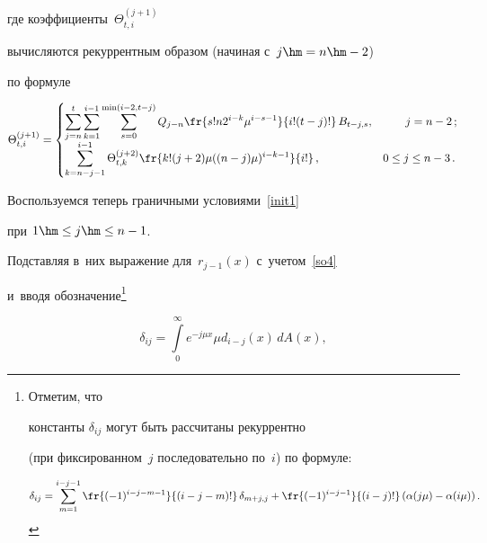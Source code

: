 где коэффициенты~$\Theta^{(j+1)}_{t,i}$

вычисляются рекуррентным образом (начиная с~$j\hm=n\hm-2$)

по формуле



\noindent

$$

\Theta^{(j+1)}_{t,i} =

\begin{cases}

\displaystyle\sum\limits_{j=n}^{t}

\sum\limits_{k=1}^{i-1}

\sum\limits_{s=0}^{\min(i-2,t-j)}Q_{j-n}

\fr{s! n 2^{i-k} \mu^{i-s-1}}{i! (t-j)! }\, B_{t-j,s}, & \hspace*{7mm}j=n-2\,;\\

\displaystyle\sum\limits_{k=n-j-1}^{i-1}\Theta^{(j+2)}_{t,k}

\fr {k!  (j+2) \mu ((n-j)\mu)^{i-k-1}}{i!}\,,

& 0\le j \le n-3\,.

\end{cases}

$$

Воспользуемся теперь граничными условиями~\eqref{init1}

при $1\hm\le j \hm\le n-1$.

Подставляя в~них выражение для~$r_{j-1}(x)$ с~учетом~\eqref{so4}

и~вводя обозначение\footnote[1]{Отметим, что

константы $\delta_{ij}$ могут быть рассчитаны рекуррентно

(при фиксированном~$j$ последовательно по~$i$) по формуле:

$$

\delta_{ij}

=\sum\limits_{m=1}^{i-j-1}

\fr{(-1)^{i-j-m-1}}{(i-j-m)!}\,

\delta_{m+j,j}+

\fr{(-1)^{i-j-1}}{(i-j)!}

\left ( \alpha(j \mu)-\alpha(i \mu)

\right ).

$$} 

$$

\delta_{ij}=\int\limits_0^\infty e^{-j\mu x} \mu d_{i-j}(x) \,dA(x),

$$

